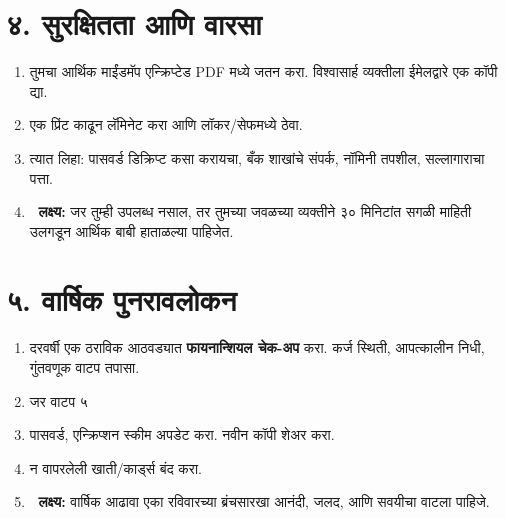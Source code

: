 \section*{४. सुरक्षितता आणि वारसा}
\begin{enumerate}
\item तुमचा आर्थिक माईंडमॅप एन्क्रिप्टेड PDF मध्ये जतन करा.  
विश्वासार्ह व्यक्तीला ईमेलद्वारे एक कॉपी द्या.  

\item एक प्रिंट काढून लॅमिनेट करा आणि लॉकर/सेफमध्ये ठेवा.  

\item त्यात लिहा: पासवर्ड डिक्रिप्ट कसा करायचा,  
बँक शाखांचे संपर्क, नॉमिनी तपशील, सल्लागाराचा पत्ता.  

\item 🎯 \textbf{लक्ष्य:} जर तुम्ही उपलब्ध नसाल,  
तर तुमच्या जवळच्या व्यक्तीने ३० मिनिटांत सगळी माहिती उलगडून  
आर्थिक बाबी हाताळल्या पाहिजेत.  
\end{enumerate}


\section*{५. वार्षिक पुनरावलोकन}
\begin{enumerate}
\item दरवर्षी एक ठराविक आठवड्यात \textbf{फायनान्शियल चेक-अप} करा.  
कर्ज स्थिती, आपत्कालीन निधी, गुंतवणूक वाटप तपासा.  

\item जर वाटप ५%

\item पासवर्ड, एन्क्रिप्शन स्कीम अपडेट करा.  
नवीन कॉपी शेअर करा.  

\item न वापरलेली खाती/कार्ड्स बंद करा.  

\item 🎯 \textbf{लक्ष्य:} वार्षिक आढावा एका रविवारच्या ब्रंचसारखा  
आनंदी, जलद, आणि सवयीचा वाटला पाहिजे.  
\end{enumerate}


